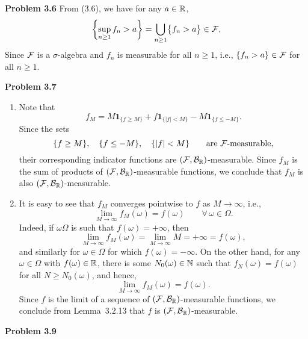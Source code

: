 \bigskip

\textbf{Problem 3.6} 
From (3.6), we have for any $a\in\mathbb R$,
\[
	\left\{ \sup_{n\ge 1} f_n>a\right\} = \bigcup_{n\ge 1} \bigl\{ f_n>a\bigr\}\in\mathcal F,
\]
Since $\mathcal F$ is a $\sigma$-algebra and $f_n$ is measurable for all $n\ge 1$, i.e., $\{f_n>a\}\in\mathcal F$ for all $n\ge 1$.


\bigskip

\textbf{Problem 3.7}

\begin{enumerate}[label=(\alph*)]
	\item Note that
	\[
		f_M = M\mathbf{1}_{\{f\ge M\}} + f\mathbf{1}_{\{|f|< M\}} - M\mathbf{1}_{\{f\le -M\}}.
	\]
	Since the sets
	\[
		\{f\ge M\},\quad \{f\le -M\},\quad \{|f|<M\}\qquad\text{are $\mathcal F$-measurable},
	\]
	their corresponding indicator functions are $(\mathcal F,\mathcal B_{\mathbb R})$-measurable. Since $f_M$ is the sum of products of $(\mathcal F,\mathcal B_{\mathbb R})$-measurable functions, we conclude that $f_M$ is also $(\mathcal F,\mathcal B_{\mathbb R})$-measurable.
	
	\item It is easy to see that $f_M$ converges pointwise to $f$ as $M\to\infty$, i.e.,
	\[
		\lim_{M\to\infty} f_M(\omega) = f(\omega)\qquad\forall\, \omega\in\Omega.
	\]
	Indeed, if $\omega\Omega$ is such that $f(\omega)=+\infty$, then
	\[
		\lim_{M\to\infty} f_M(\omega) = \lim_{M\to\infty} M = +\infty = f(\omega),
	\]
	and similarly for $\omega\in\Omega$ for which $f(\omega)=-\infty$. On the other hand, for any $\omega\in\Omega$ with $f(\omega)\in\mathbb R$, there is some $N_0(\omega)\in\mathbb N$ such that $f_N(\omega)=f(\omega)$ for all $N\ge N_0(\omega)$, and hence,
	\[
		\lim_{M\to\infty} f_M(\omega) = f(\omega).
	\]
	Since $f$ is the limit of a sequence of $(\mathcal F,\mathcal B_{\mathbb R})$-measurable functions, we conclude from Lemma~3.2.13 that $f$ is $(\mathcal F,\mathcal B_{\mathbb R})$-measurable.
\end{enumerate}

\bigskip
\textbf{Problem 3.9}

